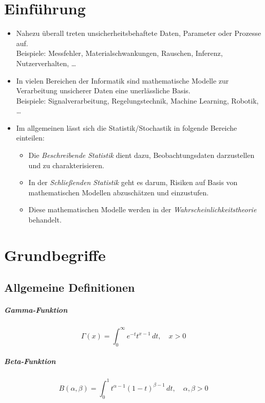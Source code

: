 \chapter{Einführung}
	\begin{itemize}
		\item Nahezu überall treten unsicherheitsbehaftete Daten, Parameter oder Prozesse auf. \\ Beispiele: Messfehler, Materialschwankungen, Rauschen, Inferenz, Nutzerverhalten, \dots
		\item In vielen Bereichen der Informatik sind mathematische Modelle zur Verarbeitung unsicherer Daten eine unerlässliche Basis. \\ Beispiele: Signalverarbeitung, Regelungstechnik, Machine Learning, Robotik, \dots
		\item Im allgemeinen lässt sich die Statistik/Stochastik in folgende Bereiche einteilen:
			\begin{itemize}
				\item Die \textit{Beschreibende Statistik} dient dazu, Beobachtungsdaten darzustellen und zu charakterisieren.
				\item In der \textit{Schließenden Statistik} geht es darum, Risiken auf Basis von mathematischen Modellen abzuschätzen und einzustufen.
				\item Diese mathematischen Modelle werden in der \textit{Wahrscheinlichkeitstheorie} behandelt.
			\end{itemize}
	\end{itemize}

\chapter{Grundbegriffe}
	\section{Allgemeine Definitionen}
		\paragraph{Gamma-Funktion}
			\begin{equation*}
				\Gamma(x) = \int_{0}^{\infty} \! e^{-t} t^{x - 1} \, dt, \quad x > 0
			\end{equation*}

		\paragraph{Beta-Funktion}
			\begin{equation*}
				B(\alpha, \beta) = \int_{0}^{1} \! t^{\alpha - 1} (1 - t) ^ { \beta - 1 } \, dt, \quad \alpha, \beta > 0
			\end{equation*}

